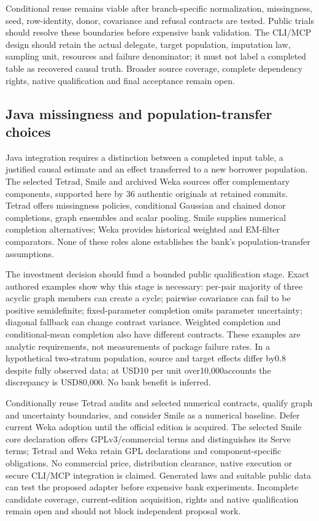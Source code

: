 Conditional reuse remains viable after branch-specific normalization,
missingness, seed, row-identity, donor, covariance and refusal contracts
are tested. Public trials should resolve these boundaries before
expensive bank validation. The CLI/MCP design should retain the actual
delegate, target population, imputation law, sampling unit, resources
and failure denominator; it must not label a completed table as
recovered causal truth. Broader source coverage, complete dependency
rights, native qualification and final acceptance remain open.
\citep{exec25_ptm_choice}

\hypertarget{java-missingness-and-population-transfer-choices}{%
\subsection{Java missingness and population-transfer
choices}\label{java-missingness-and-population-transfer-choices}}

Java integration requires a distinction between a completed input table,
a justified causal estimate and an effect transferred to a new borrower
population. The selected Tetrad, Smile and archived Weka sources offer
complementary components, supported here by 36 authentic originals at
retained commits. Tetrad offers missingness policies, conditional
Gaussian and chained donor completions, graph ensembles and scalar
pooling. Smile supplies numerical completion alternatives; Weka provides
historical weighted and EM-filter comparators. None of these roles alone
establishes the bank's population-transfer assumptions.
\citep{exec25_jtm_tetrad,exec25_jtm_smile,exec25_jtm_weka}

The investment decision should fund a bounded public qualification
stage. Exact authored examples show why this stage is necessary:
per-pair majority of three acyclic graph members can create a cycle;
pairwise covariance can fail to be positive semidefinite;
fixed-parameter completion omits parameter uncertainty; diagonal
fallback can change contrast variance. Weighted completion and
conditional-mean completion also have different contracts. These
examples are analytic requirements, not measurements of package failure
rates. In a hypothetical two-stratum population, source and target
effects differ by0.8 despite fully observed data; at USD10 per unit
over10,000accounts the discrepancy is USD80,000. No bank benefit is
inferred. \citep{exec25_jtm_choice}

Conditionally reuse Tetrad audits and selected numerical contracts,
qualify graph and uncertainty boundaries, and consider Smile as a
numerical baseline. Defer current Weka adoption until the official
edition is acquired. The selected Smile core declaration offers
GPLv3/commercial terms and distinguishes its Serve terms; Tetrad and
Weka retain GPL declarations and component-specific obligations. No
commercial price, distribution clearance, native execution or secure
CLI/MCP integration is claimed. Generated laws and suitable public data
can test the proposed adapter before expensive bank experiments.
Incomplete candidate coverage, current-edition acquisition, rights and
native qualification remain open and should not block independent
proposal work.
\citep{exec25_jtm_tetrad,exec25_jtm_smile,exec25_jtm_weka,exec25_jtm_choice}

